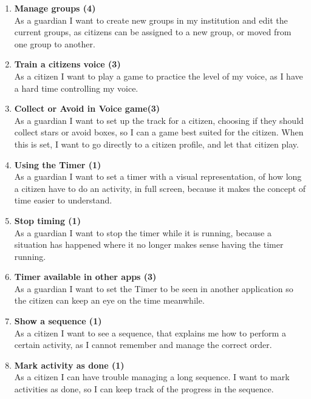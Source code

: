 \begin{enumerate}
	\item \textbf{Manage groups (4)}\\
	As a guardian I want to create new groups in my institution and edit the current groups, as citizens can be assigned to a new group, or moved from one group to another.
	
	\item \textbf{Train a citizens voice (3)}\\
	As a citizen I want to play a game to practice the level of my voice, as I have a hard time controlling my voice.
	
	\item \textbf{Collect or Avoid in Voice game(3)}\\
	As a guardian I want to set up the track for a citizen, choosing if they should collect stars or avoid boxes, so I can a game best suited for the citizen. When this is set, I want to go directly to a citizen profile, and let that citizen play.
	
	\item \textbf{Using the Timer (1)}\\
	As a guardian I want to set a timer with a visual representation, of how long a citizen have to do an activity, in full screen, because it makes the concept of time easier to understand.
	
	\item \textbf{Stop timing (1)}\\
	As a guardian I want to stop the timer while it is running, because a situation has happened where it no longer makes sense having the timer running.
	
	\item \textbf{Timer available in other apps (3)}\\
	As a guardian I want to set the Timer to be seen in another application so the citizen can keep an eye on the time meanwhile.
	
	\item \textbf{Show a sequence (1)} \\
	As a citizen I want to see a sequence, that explains me how to perform a certain activity, as I cannot remember and manage the correct order.
	
	\item \textbf{Mark activity as done (1)}\\
	As a citizen I can have trouble managing a long sequence. I want to mark activities as done, so I can keep track of the progress in the sequence.
	

\end{enumerate}
